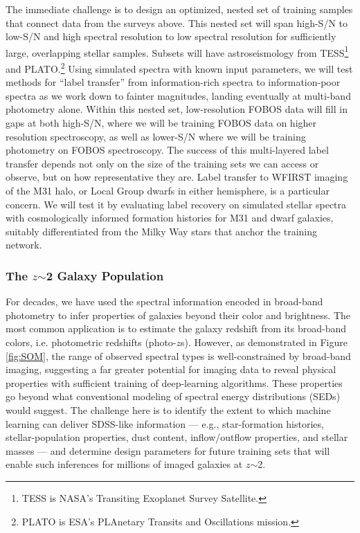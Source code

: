 The immediate challenge is to design an optimized, nested set of
training samples that connect data from the surveys above. This
nested set will span high-S/N to low-S/N and high spectral resolution
to low spectral resolution for sufficiently large, overlapping
stellar samples. Subsets will have astroseismology from
TESS\footnote{TESS is NASA's Transiting Exoplanet Survey Satellite.}
and PLATO.\footnote{PLATO is ESA's PLAnetary Transits and
Oscillations mission.} Using simulated spectra with known input
parameters, we will test methods for ``label transfer'' from
information-rich spectra to information-poor spectra as we work down
to fainter magnitudes, landing eventually at multi-band photometry
alone. Within this nested set, low-resolution FOBOS data will fill in
gaps at both high-S/N, where we will be training FOBOS data on higher
resolution spectroscopy, as well as lower-S/N where we will be
training photometry on FOBOS spectroscopy. The success of this
multi-layered label transfer depends not only on the size of the
training sets we can access or observe, but on how representative
they are. Label transfer to WFIRST imaging of the M31 halo, or Local
Group dwarfs in either hemisphere, is a particular concern. We will
test it by evaluating label recovery on simulated stellar spectra
with cosmologically informed formation histories for M31 and dwarf
galaxies, suitably differentiated from the Milky Way stars that
anchor the training network.


\subsubsection{The $z$$\sim$2 Galaxy Population}

For decades, we have used the spectral information encoded in
broad-band photometry to infer properties of galaxies beyond their
color and brightness. The most common application is to estimate the
galaxy redshift from its broad-band colors, i.e. photometric
redshifts (photo-$z$s). However, as demonstrated in Figure
\ref{fig:SOM}, the range of observed spectral types is
well-constrained by broad-band imaging, suggesting a far greater
potential for imaging data to reveal physical properties with
sufficient training of deep-learning algorithms.  These properties go beyond what conventional modeling of spectral energy
distributions (SEDs) would suggest. The challenge here is to identify
the extent to which machine learning can deliver SDSS-like
information --- e.g., star-formation histories, stellar-population
properties, dust content, inflow/outflow properties, and stellar
masses --- and determine design parameters for future training sets
that will enable such inferences for millions of imaged galaxies at
$z$$\sim$2.

